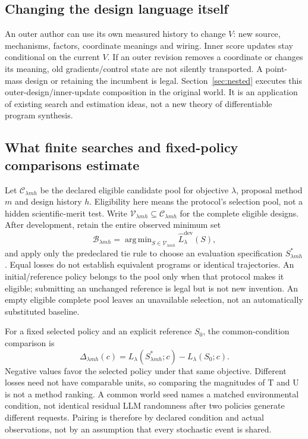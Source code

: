 \subsection{Changing the design language itself}
An outer author can use its own measured history to change $V$: new source,
mechanisms, factors, coordinate meanings and wiring. Inner score updates stay
conditional on the current $V$. If an outer revision removes a coordinate or
changes its meaning, old gradients/control state are not silently transported.
A point-mass design or retaining the incumbent is legal. Section~\ref{sec:nested}
executes this outer-design/inner-update composition in the original world.
It is an application of existing search and estimation ideas, not a new
theory of differentiable program synthesis.

\subsection{What finite searches and fixed-policy comparisons estimate}
\label{sec:finite-estimands}
Let $\mathcal C_{\lambda mh}$ be the declared eligible candidate pool for
objective $\lambda$, proposal method $m$ and design history $h$. Eligibility
here means the protocol's selection pool, not a hidden scientific-merit test.
Write $\mathcal V_{\lambda mh}\subseteq\mathcal C_{\lambda mh}$ for the
complete eligible designs. After development, retain the entire observed minimum set
\begin{equation}
 \mathcal B_{\lambda mh}=
 \mathop{\mathrm{arg\,min}}_{S\in\mathcal V_{\lambda mh}}
 \widehat L^{\mathrm{dev}}_\lambda(S),
 \label{eq:finite-minimum-set}
\end{equation}
and apply only the predeclared tie rule to choose an evaluation specification
$S^*_{\lambda mh}$. Equal losses do not establish equivalent programs or
identical trajectories. An initial/reference policy belongs to the pool only
when that protocol makes it eligible; submitting an unchanged reference is
legal but is not new invention. An empty eligible complete pool leaves an
unavailable selection, not an automatically substituted baseline.

For a fixed selected policy and an explicit reference $S_0$, the common-condition
comparison is
\begin{equation}
 \Delta_{\lambda mh}(c)=
 L_\lambda(S^*_{\lambda mh};c)-L_\lambda(S_0;c).
 \label{eq:reference-relative-loss}
\end{equation}
Negative values favor the selected policy under that same objective. Different
losses need not have comparable units, so comparing the magnitudes of T and U
is not a method ranking. A common world seed names a matched environmental
condition, not identical residual LLM randomness after two policies generate
different requests. Pairing is therefore by declared condition and actual
observations, not by an assumption that every stochastic event is shared.


